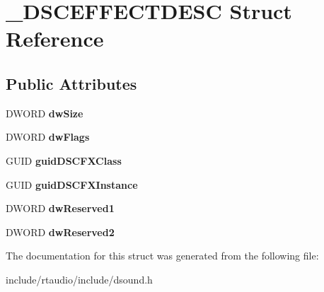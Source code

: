 \hypertarget{struct___d_s_c_e_f_f_e_c_t_d_e_s_c}{}\section{\+\_\+\+D\+S\+C\+E\+F\+F\+E\+C\+T\+D\+E\+SC Struct Reference}
\label{struct___d_s_c_e_f_f_e_c_t_d_e_s_c}
\subsection*{Public Attributes}
\begin{DoxyCompactItemize}
\item 
D\+W\+O\+RD {\bfseries dw\+Size}\hypertarget{struct___d_s_c_e_f_f_e_c_t_d_e_s_c_a1fae05aabab67a68b1756bf6f64f3cef}{}\label{struct___d_s_c_e_f_f_e_c_t_d_e_s_c_a1fae05aabab67a68b1756bf6f64f3cef}

\item 
D\+W\+O\+RD {\bfseries dw\+Flags}\hypertarget{struct___d_s_c_e_f_f_e_c_t_d_e_s_c_a1280d674cb8ea7e24a6c1b332841bd28}{}\label{struct___d_s_c_e_f_f_e_c_t_d_e_s_c_a1280d674cb8ea7e24a6c1b332841bd28}

\item 
G\+U\+ID {\bfseries guid\+D\+S\+C\+F\+X\+Class}\hypertarget{struct___d_s_c_e_f_f_e_c_t_d_e_s_c_afe308a57647430114167a7b9bee339a4}{}\label{struct___d_s_c_e_f_f_e_c_t_d_e_s_c_afe308a57647430114167a7b9bee339a4}

\item 
G\+U\+ID {\bfseries guid\+D\+S\+C\+F\+X\+Instance}\hypertarget{struct___d_s_c_e_f_f_e_c_t_d_e_s_c_a036b59532251f4d7f8be1b3b100f2e72}{}\label{struct___d_s_c_e_f_f_e_c_t_d_e_s_c_a036b59532251f4d7f8be1b3b100f2e72}

\item 
D\+W\+O\+RD {\bfseries dw\+Reserved1}\hypertarget{struct___d_s_c_e_f_f_e_c_t_d_e_s_c_a695ddee42ba0da0027e2270ed4da07a2}{}\label{struct___d_s_c_e_f_f_e_c_t_d_e_s_c_a695ddee42ba0da0027e2270ed4da07a2}

\item 
D\+W\+O\+RD {\bfseries dw\+Reserved2}\hypertarget{struct___d_s_c_e_f_f_e_c_t_d_e_s_c_acfefa4d98179ad88a6cac462e629af00}{}\label{struct___d_s_c_e_f_f_e_c_t_d_e_s_c_acfefa4d98179ad88a6cac462e629af00}

\end{DoxyCompactItemize}


The documentation for this struct was generated from the following file\+:\begin{DoxyCompactItemize}
\item 
include/rtaudio/include/dsound.\+h\end{DoxyCompactItemize}
